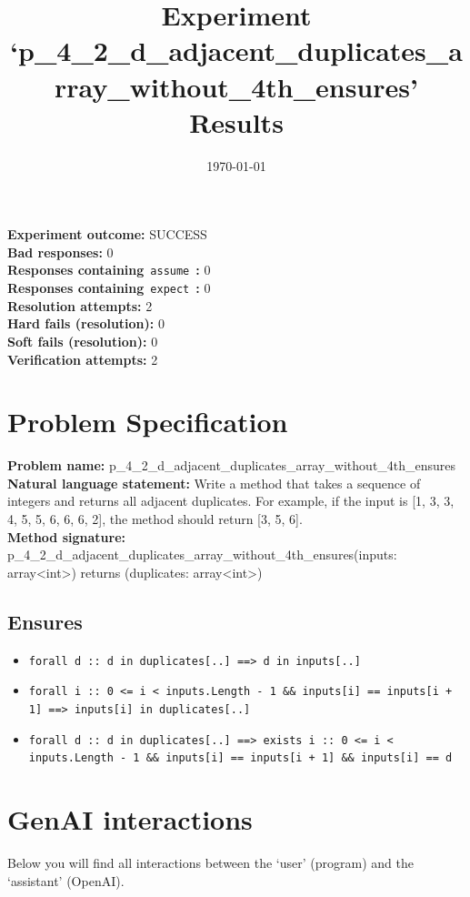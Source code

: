 \documentclass{article}
\begin{document}
\title{Experiment `p\_4\_2\_d\_adjacent\_duplicates\_array\_without\_4th\_ensures' Results}
\author{\today}
\date{}
\maketitle
\textbf{Experiment outcome: }SUCCESS
\\\textbf{Bad responses: }0
\\\textbf{Responses containing}~\texttt{assume}~\textbf{: }0
\\\textbf{Responses containing}~\texttt{expect}~\textbf{: }0
\\\textbf{Resolution attempts: }2
\\\textbf{Hard fails (resolution): }0
\\\textbf{Soft fails (resolution): }0
\\\textbf{Verification attempts: }2
\section*{Problem Specification}
\textbf{Problem name: }p\_4\_2\_d\_adjacent\_duplicates\_array\_without\_4th\_ensures
\\\textbf{Natural language statement: }Write a method that takes a sequence of integers and returns all adjacent duplicates. For example, if the input is [1, 3, 3, 4, 5, 5, 6, 6, 6, 2], the method should return [3, 5, 6].
\\\textbf{Method signature: }p\_4\_2\_d\_adjacent\_duplicates\_array\_without\_4th\_ensures(inputs: array<int>) returns (duplicates: array<int>)
\subsection*{Ensures}
\begin{itemize}
\item \texttt{forall d :: d in duplicates[..] ==> d in inputs[..]}
\item \texttt{forall i :: 0 <= i < inputs.Length - 1 \&\& inputs[i] == inputs[i + 1] ==> inputs[i] in duplicates[..]}
\item \texttt{forall d :: d in duplicates[..] ==> exists i :: 0 <= i < inputs.Length - 1 \&\& inputs[i] == inputs[i + 1] \&\& inputs[i] == d}
\end{itemize}
\clearpage
\section*{GenAI interactions}
Below you will find all interactions between the `user' (program) and the `assistant' (OpenAI).
\end{document}
